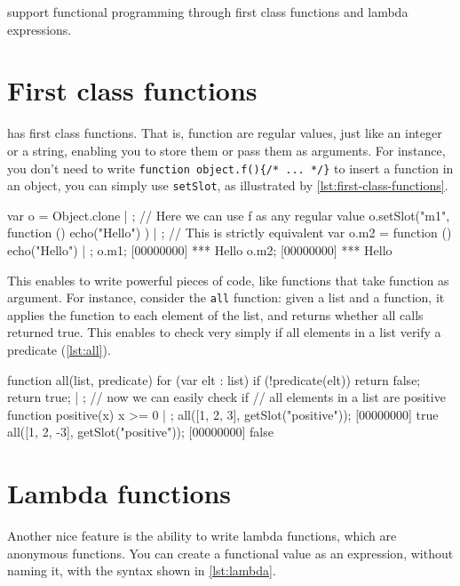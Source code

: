 \documentclass[openright,twoside,12pt]{report}
\begin{document}
\urbi support functional programming through first class functions and
lambda expressions.

\section{First class functions}

\urbi has first class functions. That is, function are regular values,
just like an integer or a string, enabling you to store them or pass
them as arguments. For instance, you don't need to write
\lstinline|function object.f(){/* ... */}| to insert a function in an
object, you can simply use \texttt{setSlot}, as illustrated by
\autoref{lst:first-class-functions}.

\begin{urbiscript}[caption=First class functions,
  label=lst:first-class-functions]
var o = Object.clone | {};
// Here we can use f as any regular value
o.setSlot("m1", function () { echo("Hello") }) | {};
// This is strictly equivalent
var o.m2 = function () { echo("Hello") } | {};
o.m1;
[00000000] *** Hello
o.m2;
[00000000] *** Hello
\end{urbiscript}

This enables to write powerful pieces of code, like functions that
take function as argument. For instance, consider the \texttt{all}
function: given a list and a function, it applies the function to each
element of the list, and returns whether all calls returned true. This
enables to check very simply if all elements in a list verify a
predicate (\autoref{lst:all}).

\begin{urbiscript}[caption=Functional programming: the \texttt{all}
  function, label=lst:all, name=all]
function all(list, predicate)
{
  for (var elt : list)
    if (!predicate(elt))
      return false;
  return true;
} | {};
// now we can easily check if
// all elements in a list are positive
function positive(x) { x >= 0 } | {};
all([1, 2, 3], getSlot("positive"));
[00000000] true
all([1, 2, -3], getSlot("positive"));
[00000000] false
\end{urbiscript}

\section{Lambda functions}

Another nice feature is the ability to write lambda functions, which
are anonymous functions. You can create a functional value as an
expression, without naming it, with the syntax shown in \autoref{lst:lambda}.
\end{document}
